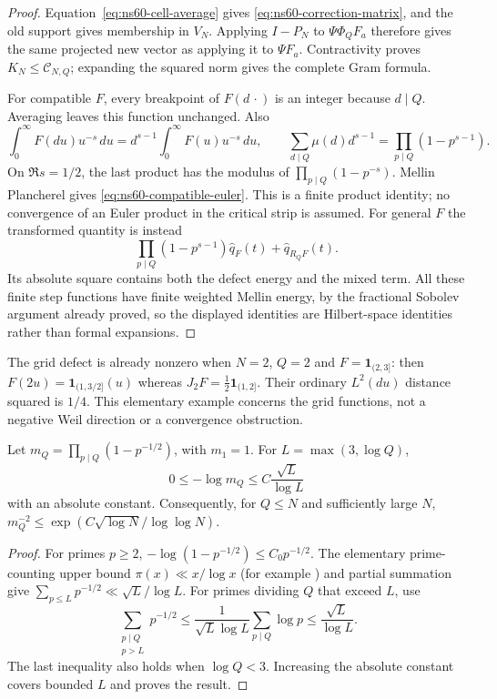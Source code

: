 \begin{proof}
Equation~\eqref{eq:ns60-cell-average} gives
\eqref{eq:ns60-correction-matrix}, and the old support gives membership
in $V_N$. Applying $I-P_N$ to $\Psi\Phi_QF_a$ therefore gives the
same projected new vector as applying it to $\Psi F_a$.
Contractivity proves $K_N\leq\mathcal C_{N,Q}$; expanding the squared
norm gives the complete Gram formula.

For compatible $F$, every breakpoint of $F(d\,\cdot)$ is an integer
because $d\mid Q$. Averaging leaves this function unchanged. Also
\[
 \int_0^\infty F(du)u^{-s}\,du
       =d^{s-1}\int_0^\infty F(u)u^{-s}\,du,
 \qquad
 \sum_{d\mid Q}\mu(d)d^{s-1}=\prod_{p\mid Q}(1-p^{s-1}).
\]
On $\Re s=1/2$, the last product has the modulus of
$\prod_{p\mid Q}(1-p^{-s})$. Mellin Plancherel gives
\eqref{eq:ns60-compatible-euler}. This is a finite product identity;
no convergence of an Euler product in the critical strip is assumed.
For general $F$ the transformed
quantity is instead
\[
 \prod_{p\mid Q}(1-p^{s-1})\widehat q_F(t)
                           +\widehat q_{R_QF}(t).
\]
Its absolute square contains both the defect energy and the mixed term.
All these finite step functions have finite weighted Mellin energy,
by the fractional Sobolev argument already proved, so the displayed
identities are Hilbert-space identities rather than formal expansions.
\end{proof}

The grid defect is already nonzero when $N=2$, $Q=2$ and
$F=\mathbf1_{(2,3]}$: then
$F(2u)=\mathbf1_{(1,3/2]}(u)$ whereas
$J_2F=\tfrac12\mathbf1_{(1,2]}$.
Their ordinary $L^2(du)$ distance squared is $1/4$.
This elementary example concerns the grid functions, not a negative
Weil direction or a convergence obstruction.

\begin{lemma}
\label{lem:ns60-euler-minimum}
Let $m_Q=\prod_{p\mid Q}(1-p^{-1/2})$, with $m_1=1$.
For $L=\max(3,\log Q)$,
\begin{equation}
 0\leq-\log m_Q\leq C\frac{\sqrt L}{\log L}
 \label{eq:ns60-euler-minimum}
\end{equation}
with an absolute constant. Consequently, for $Q\leq N$ and sufficiently
large $N$,
$m_Q^{-2}\leq\exp(C\sqrt{\log N}/\log\log N)$.
\end{lemma}
\begin{proof}
For primes $p\geq2$,
$-\log(1-p^{-1/2})\leq C_0p^{-1/2}$.
The elementary prime-counting upper bound
$\pi(x)\ll x/\log x$ (for example
\cite[Corollary 1, Eq. (3.6)]{RosserSchoenfeld1962}) and partial
summation give $\sum_{p\leq L}p^{-1/2}\ll\sqrt L/\log L$.
For primes dividing $Q$ that exceed $L$, use
\[
 \sum_{\substack{p\mid Q\\p>L}}p^{-1/2}
 \leq\frac1{\sqrt L\log L}\sum_{p\mid Q}\log p
 \leq\frac{\sqrt L}{\log L}.
\]
The last inequality also holds when $\log Q<3$. Increasing the absolute
constant covers bounded $L$ and proves the result.
\end{proof}

